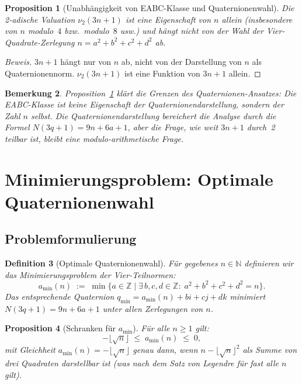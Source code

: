 \documentclass[12pt,a4paper]{article}
\newtheorem{definition}{Definition}[section]
\newtheorem{proposition}[definition]{Proposition}
\newtheorem{bemerkung}[definition]{Bemerkung}
\newenvironment{beweis}{\begin{proof}[Beweis]}{\end{proof}}
\newcommand{\vii}{\nu_2}
\newcommand{\N}{\mathbb{N}}
\newcommand{\Z}{\mathbb{Z}}
\begin{document}
\begin{proposition}[Unabhängigkeit von EABC-Klasse und Quaternionenwahl]
\label{prop:unabhaengigkeit}
Die 2-adische Valuation $\vii(3n+1)$ ist eine Eigenschaft von $n$ allein
(insbesondere von $n$ modulo~$4$ bzw.\ modulo~$8$ usw.) und hängt \emph{nicht}
von der Wahl der Vier-Quadrate-Zerlegung $n = a^2+b^2+c^2+d^2$ ab.
\end{proposition}

\begin{beweis}
$3n+1$ hängt nur von $n$ ab, nicht von der Darstellung von $n$ als Quaternionennorm.
$\vii(3n+1)$ ist eine Funktion von $3n+1$ allein.
\end{beweis}

\begin{bemerkung}
Proposition~\ref{prop:unabhaengigkeit} klärt die Grenzen des Quaternionen-Ansatzes:
Die EABC-Klasse ist keine Eigenschaft der Quaternionendarstellung, sondern der Zahl $n$
selbst. Die Quaternionendarstellung bereichert die Analyse durch die Formel
$N(3q+1) = 9n+6a+1$, aber die Frage, \emph{wie weit} $3n+1$ durch~2 teilbar ist,
bleibt eine modulo-arithmetische Frage.
\end{bemerkung}

\section{Minimierungsproblem: Optimale Quaternionenwahl}
\label{sec:minimierung}

\subsection{Problemformulierung}

\begin{definition}[Optimale Quaternionenwahl]
\label{def:optimal}
Für gegebenes $n \in \N$ definieren wir das \emph{Minimierungsproblem der Vier-Teilnormen}:
\[
  a_{\min}(n) \;:=\; \min\bigl\{ a \in \Z \;\big|\; \exists\, b,c,d \in \Z:\;
    a^2+b^2+c^2+d^2 = n \bigr\}.
\]
Das entsprechende Quaternion $q_{\min} = a_{\min}(n) + bi + cj + dk$ minimiert
$N(3q+1) = 9n + 6a + 1$ unter allen Zerlegungen von $n$.
\end{definition}

\begin{proposition}[Schranken für $a_{\min}$]
\label{prop:amin}
Für alle $n \geq 1$ gilt:
\[
  -\lfloor\sqrt{n}\rfloor \;\leq\; a_{\min}(n) \;\leq\; 0,
\]
mit Gleichheit $a_{\min}(n) = -\lfloor\sqrt{n}\rfloor$ genau dann, wenn
$n - \lfloor\sqrt{n}\rfloor^2$ als Summe von drei Quadraten darstellbar ist
(was nach dem Satz von Legendre für fast alle $n$ gilt).
\end{proposition}
\end{document}
